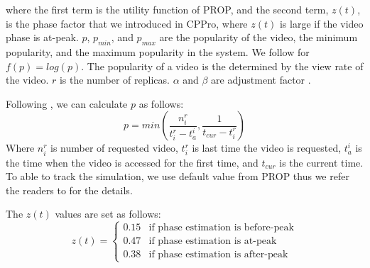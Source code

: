 \documentclass[10pt,final,journal,a4paper]{IEEEtran}
\begin{document}
where the first term is the utility function of PROP, and the second term, $z(t)$, is the phase factor that we introduced in CPPro, where $z(t)$ is large if the video phase is at-peak.
$p$, $p_{min}$, and $p_{max}$ are the popularity of the video, the minimum popularity, and the maximum popularity in the system.
We follow \cite{1613869} for $f(p) = log(p)$.
The popularity of a video is the determined by the view rate of the video.
$r$ is the number of replicas. 
$\alpha$ and $\beta$ are adjustment factor \cite{1613869}.

Following \cite{1613869}, we can calculate $p$ as follows:
\begin{equation}
p = min \left(\frac{n_i^r}{t_i^r - t_a^i}  , \frac{1}{t_{cur} - t_i^r}\right)
\end{equation}
Where $n_i^r$ is number of requested video, $t_i^r$ is last time the video is requested, $t_a^i$ is the time when the video is accessed for the first time, and $t_{cur}$ is the current time.
To able to track the simulation, we use default value from PROP thus we refer the readers to \cite{1613869} for the details.

The $z(t)$ values are set as follows:
\begin{equation}
 z(t) = 
  \begin{cases}
   0.15 & \text{if phase estimation is before-peak} \\
   0.47 & \text{if phase estimation is at-peak} \\
   0.38 & \text{if phase estimation is after-peak}
  \end{cases}
\end{equation}\label{eq:zfactor}
\end{document}
